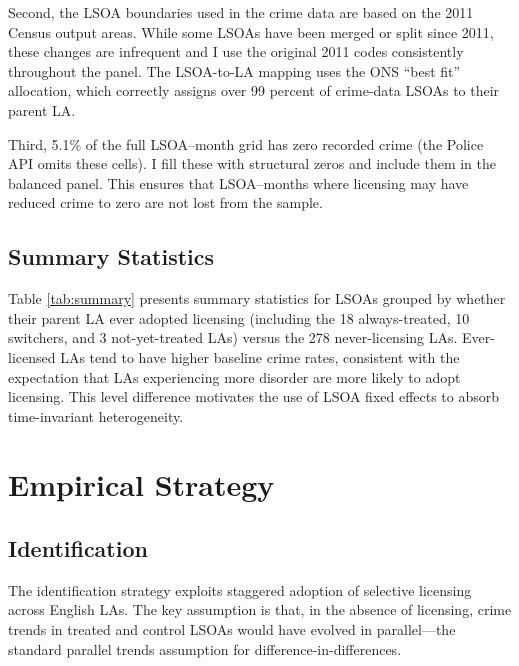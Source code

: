 \documentclass[12pt]{article}
\begin{document}
Second, the LSOA boundaries used in the crime data are based on the 2011 Census output areas. While some LSOAs have been merged or split since 2011, these changes are infrequent and I use the original 2011 codes consistently throughout the panel. The LSOA-to-LA mapping uses the ONS ``best fit'' allocation, which correctly assigns over 99 percent of crime-data LSOAs to their parent LA.

Third, 5.1\% of the full LSOA--month grid has zero recorded crime (the Police API omits these cells). I fill these with structural zeros and include them in the balanced panel. This ensures that LSOA--months where licensing may have reduced crime to zero are not lost from the sample.

\subsection{Summary Statistics}



Table \ref{tab:summary} presents summary statistics for LSOAs grouped by whether their parent LA ever adopted licensing (including the 18 always-treated, 10 switchers, and 3 not-yet-treated LAs) versus the 278 never-licensing LAs. Ever-licensed LAs tend to have higher baseline crime rates, consistent with the expectation that LAs experiencing more disorder are more likely to adopt licensing. This level difference motivates the use of LSOA fixed effects to absorb time-invariant heterogeneity.


\section{Empirical Strategy}

\subsection{Identification}

The identification strategy exploits staggered adoption of selective licensing across English LAs. The key assumption is that, in the absence of licensing, crime trends in treated and control LSOAs would have evolved in parallel---the standard parallel trends assumption for difference-in-differences.
\end{document}
